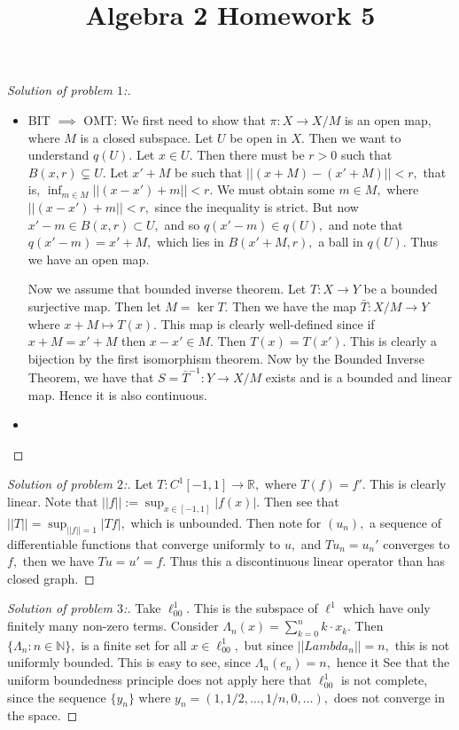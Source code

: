 \documentclass[letterpaper,11pt,twoside]{article}
\title{Algebra 2 Homework 5}
\theoremstyle{proposition}
\theoremstyle{definition}
\theoremstyle{theorem}
\theoremstyle{definition}
\theoremstyle{definition}
\theoremstyle{definition}
\theoremstyle{lemma}
\theoremstyle{definition}
\theoremstyle{definition}
\theoremstyle{corollary}
\theoremstyle{definition}
\theoremstyle{definition}
\theoremstyle{definition}
\newcommand{\norm}[1]{\left \vert \left \vert #1 \right \vert \right \vert}
\begin{document}
	\maketitle
	\begin{proof}[Solution of problem $1$:]
		\begin{itemize}
			\item BIT $\implies$ OMT: We first need to show that $\pi: X \to X/M$ is an open map, where $M$ is a closed subspace. Let $U$ be open in $X.$ 
			Then we want to understand $q(U).$ Let $x \in U.$ Then there must be $r >0$ such that $B(x,r) \subsetneq U.$ Let $x'+M$ be such that 
			$\norm{(x+M)-(x'+M)} <r,$ that is, $\inf_{m \in M} \norm{(x-x')+m} <r.$ We must obtain some $m \in M,$ where $ \norm{(x-x')+m} <r,$ since the 
			inequality is strict. But now $x'-m \in B(x,r) \subset U,$ and so $q(x'-m) \in q(U),$ and note that $q(x'-m)=x'+M,$ which lies in $B(x'+M,r),$ a 
			ball in $q(U).$ Thus we have an open map.
			
			Now we assume that bounded inverse theorem. Let $T:X \to Y$ be a bounded surjective map. Then let $M=\ker T.$ Then we have the map $\bar{T}: X/M 
			\to Y$ where $x+M \mapsto T(x).$  This map is clearly well-defined since if $x+M=x'+M$ then $x-x' \in M.$ Then $T(x)=T(x').$ This is clearly a 
			bijection by the first isomorphism theorem.  Now by the Bounded Inverse Theorem, we have that $S= \bar{T}^{-1}: Y \to X/M$ exists and is a 
			bounded and linear map. Hence it is also continuous. 
			\item 
		\end{itemize}
	\end{proof}
\begin{proof}[Solution of problem $2$:]
	Let $T: C^1[-1,1] \to \mathbb{R},$ where $T(f)=f'.$ This is clearly linear. Note that $\norm{f}:= \sup_{x \in [-1,1]} |f(x)|.$ Then see that $\norm{T}= 
	\sup_{\norm{f}=1}|Tf|,$ which is unbounded. Then note for $(u_n),$ a sequence of differentiable functions that converge uniformly to $u,$ and 
	$Tu_n=u_n'$ converges to $f,$ then we have $Tu=u'=f.$ Thus this a discontinuous linear operator than has closed graph.   
\end{proof}
\begin{proof}[Solution of problem $3$:]
	Take $\ell^{1}_{00}.$ This is the subspace of $\ell^1$ which have only finitely many non-zero terms. Consider $\Lambda_{n}(x)= \sum_{k=0}^{n}k \cdot 
	x_k.$ Then $\{\Lambda_n: n \in \mathbb{N}\},$ is a finite set for all $x \in \ell^{1}_{00},$ but since $\norm{Lambda_n}=n,$ this is not uniformly 
	bounded. This is easy to see, since $\Lambda_{n}(e_n)=n,$ hence it  See that the uniform boundedness principle does not apply here that $\ell^1_{00}$ is 
	not complete, since the sequence $\{y_n\}$  where $y_n= (1, 1/2, \dots, 1/n, 0 ,\dots),$ does not converge in the space.  
\end{proof}
\end{document}
